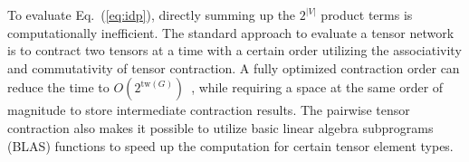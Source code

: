\documentclass[onefignum, onetabnum]{siamart190516}
\newcommand{\<}{\langle}
\renewcommand{\>}{\rangle}
\newcommand{\Eq}[1]{Eq.~(\ref{#1})}
\begin{document}
To evaluate \Eq{eq:idp}, directly summing up the $2^{|V|}$ product terms is computationally inefficient.
The standard approach to evaluate a tensor network is to contract two tensors at a time with a certain order utilizing the associativity and commutativity of tensor contraction.
A fully optimized contraction order can reduce the time to $O(2^{\text{tw}(G)})$~\cite{Markov2008}, while requiring a space at the same order of magnitude to store intermediate contraction results.
The pairwise tensor contraction also makes it possible to utilize basic linear algebra subprograms (BLAS) functions to speed up the computation for certain tensor element types.
\end{document}
